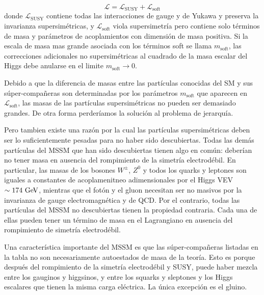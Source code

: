 \begin{equation}
  \mathcal{L} = \mathcal{L}_\text{SUSY} + \mathcal{L}_\text{soft}
\end{equation}
%
donde $\mathcal{L}_\text{SUSY}$ contiene todas las interacciones de gauge y
de Yukawa y preserva la invarianza supersimétricas, y $\mathcal{L}_\text{soft}$
viola supersimetría pero contiene solo términos de masa y parámetros de
acoplamientos con dimensión de masa positiva.
Si la escala de masa mas grande asociada  con los términos soft se llama $m_\text{soft}$,
las correcciones adicionales no supersimétricas al cuadrado de la masa escalar del Higgs
debe anularse en el limite $m_\text{soft} \to 0$.

Debido a que la diferencia de masas entre las partículas conocidas del SM y sus
súper-compañeras son determinadas por los parámetros $m_\text{soft}$ que aparecen
en $\mathcal{L}_\text{soft}$, las masas de las partículas supersimétricas no
pueden ser demasiado grandes. De otra forma perderíamos la solución al problema
de jerarquía.

Pero tambien existe una razón por la cual las partículas supersimétricas deben ser lo
suficientemente pesadas para no haber sido descubiertas. Todas las demás partículas del
MSSM que han sido descubiertas tienen algo en com\'un: deberían no tener masa en ausencia
del rompimiento de la simetría electrodébil.
En particular, las masas de los bosones $W^\pm$, $Z^0$ y todos los quarks y leptones
son iguales a constantes de acoplamenitneo adimensionales por el Higgs VEV $\sim 174 \gev$,
mientras que el fotón y el gluon necesitan ser no masivos por la invarianza de gauge
electromagnética y de QCD. Por el contrario, todas las partículas del MSSM no descubiertas
tienen la propiedad contraria. Cada una de ellas pueden tener un término de masa en el
Lagrangiano en ausencia del rompimiento de simetría electrodébil.

Una característica importante del MSSM es que las súper-compañeras listadas en la
tabla no son necesariamente autoestados de masa de la teoría. Esto es porque después
del rompimiento de la simetría electrodébil y SUSY, puede haber mezcla entre los gauginos
y higgsinos, y entre los squarks y sleptones y los Higgs escalares que tienen la misma
carga eléctrica. La única excepción es el gluino.



